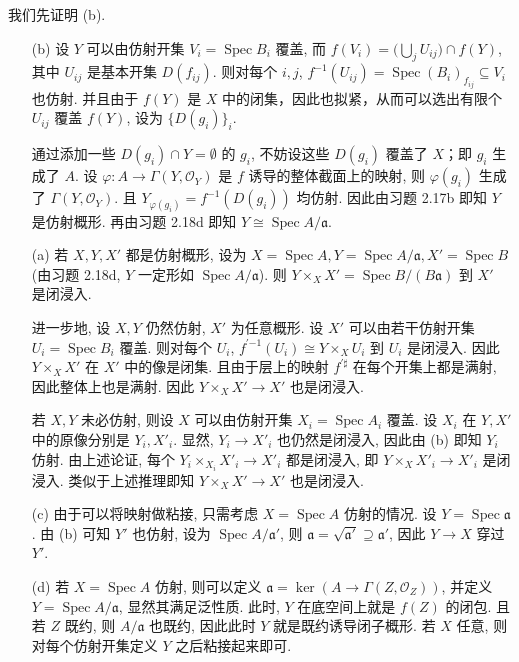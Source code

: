 \documentclass{article}
\theoremstyle{exercise}
\newenvironment{proofc}{\proof}{\endproof}
\def\ga{\mathfrak{a}}
\def\cO{\mathcal{O}}
\def\Spec{\operatorname{Spec}}
\begin{document}
\begin{proofc}
  我们先证明 (b).
  \begin{enumerate}
    \item[(b)] 设 $Y$ 可以由仿射开集 $V_i = \Spec B_i$ 覆盖,
          而 $f(V_i) = \bigl(\bigcup_j U_{ij}\bigr) \cap f(Y)$,
          其中 $U_{ij}$ 是基本开集 $D(f_{ij})$.
          则对每个 $i, j$, $f^{-1}(U_{ij}) = \Spec (B_i)_{f_{ij}} \subseteq V_i$ 也仿射.
          并且由于 $f(Y)$ 是 $X$ 中的闭集，因此也拟紧，从而可以选出有限个 $U_{ij}$ 覆盖 $f(Y)$,
          设为 $\{ D(g_i) \}_i$.

          通过添加一些 $D(g_i) \cap Y = \emptyset$ 的 $g_i$,
          不妨设这些 $D(g_i)$ 覆盖了 $X$；即 $g_i$ 生成了 $A$.
          设 $\varphi \colon A \to \Gamma(Y, \cO_Y)$ 是 $f$ 诱导的整体截面上的映射,
          则 $\varphi(g_i)$ 生成了 $\Gamma(Y, \cO_Y)$.
          且 $Y_{\varphi(g_i)} = f^{-1}(D(g_i))$ 均仿射.
          因此由习题 2.17b 即知 $Y$ 是仿射概形.
          再由习题 2.18d 即知 $Y \cong \Spec A / \ga$.

    \item[(a)] 若 $X, Y, X'$ 都是仿射概形, 设为 $X = \Spec A, Y = \Spec A / \ga, X' = \Spec B$
          (由习题 2.18d, $Y$ 一定形如 $\Spec A / \ga$).
          则 $Y \times_X X' = \Spec B / (B \ga)$ 到 $X'$ 是闭浸入.

          进一步地, 设 $X, Y$ 仍然仿射, $X'$ 为任意概形.
          设 $X'$ 可以由若干仿射开集 $U_i = \Spec B_i$ 覆盖.
          则对每个 $U_i$, $f^{\prime {-1}}(U_i) \cong Y \times_X U_i$ 到 $U_i$ 是闭浸入.
          因此 $Y \times_X X'$ 在 $X'$ 中的像是闭集.
          且由于层上的映射 $f^{\prime\sharp}$ 在每个开集上都是满射, 因此整体上也是满射.
          因此 $Y \times_X X' \to X'$ 也是闭浸入.

          若 $X, Y$ 未必仿射, 则设 $X$ 可以由仿射开集 $X_i = \Spec A_i$ 覆盖.
          设 $X_i$ 在 $Y, X'$ 中的原像分别是 $Y_i, X'_i$.
          显然, $Y_i \to X'_i$ 也仍然是闭浸入, 因此由 (b) 即知 $Y_i$ 仿射.
          由上述论证, 每个 $Y_i \times_{X_i} X'_i \to X'_i$ 都是闭浸入,
          即 $Y \times_X X'_i \to X'_i$ 是闭浸入.
          类似于上述推理即知 $Y \times_X X' \to X'$ 也是闭浸入.
    \item[(c)] 由于可以将映射做粘接, 只需考虑 $X = \Spec A$ 仿射的情况.
          设 $Y = \Spec \ga$. 由 (b) 可知 $Y'$ 也仿射, 设为 $\Spec A / \ga'$,
          则 $\ga = \sqrt{\ga'} \supseteq \ga'$, 因此 $Y \to X$ 穿过 $Y'$.
    \item[(d)] 若 $X = \Spec A$ 仿射, 则可以定义 $\ga = \ker (A \to \Gamma(Z, \cO_Z))$,
          并定义 $Y = \Spec A / \ga$, 显然其满足泛性质.
          此时, $Y$ 在底空间上就是 $f(Z)$ 的闭包.
          且若 $Z$ 既约, 则 $A / \ga$ 也既约, 因此此时 $Y$ 就是既约诱导闭子概形.
          若 $X$ 任意, 则对每个仿射开集定义 $Y$ 之后粘接起来即可.
          \qedhere
  \end{enumerate}
\end{proofc}
\end{document}
